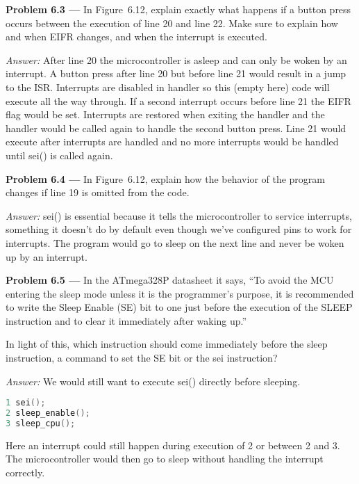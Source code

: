 \documentclass[11pt]{article}
\newcommand{\problem}[1]{\textbf{Problem #1 ---} }
\newcommand{\answer}{\textit{Answer: } }
\begin{document}
\problem{6.3} In Figure~6.12, explain exactly what happens if a button press occurs between the execution of line 20 and line 22.  Make sure to explain how and when \textsf{EIFR} changes, and when the interrupt is executed.

\answer After line 20 the microcontroller is asleep and can only be woken by an interrupt.
A button press after line 20 but before line 21 would result in a jump to the ISR. Interrupts are disabled in handler so this (empty here) code will execute all the way through.
If a second interrupt occurs before line 21 the EIFR flag would be set. Interrupts are restored when exiting the handler and the handler would be called again to handle the second button press.
Line 21 would execute after interrupts are handled and no more interrupts would be handled until \textsf{sei()} is called again.

\problem{6.4} In Figure~6.12, explain how the behavior of the program changes
if line 19 is omitted from the code.

\answer \textsf{sei()} is essential because it tells the microcontroller to service interrupts, something it doesn't do by default even though we've configured pins to work for interrupts. The program would go to sleep on the next line and never be woken up by an interrupt.

\problem{6.5} In the ATmega328P datasheet it says, ``To avoid the MCU entering
the sleep mode unless it is the programmer’s purpose, it is recommended to
write the Sleep Enable (\textsf{SE}) bit to one just before the execution of
the \textsf{SLEEP} instruction and to clear it immediately after waking up.''

In light of this, which instruction should come immediately before the sleep
instruction, a command to set the \textsf{SE} bit or the \textsf{sei}
instruction?

\answer We would still want to execute \textsf{sei()} directly before sleeping.

\begin{lstlisting}[language=C,columns=flexible,basicstyle=\ttfamily,commentstyle=\ttfamily]
1 sei();
2 sleep_enable();
3 sleep_cpu();
\end{lstlisting}

Here an interrupt could still happen during execution of 2 or between 2 and 3.
The microcontroller would then go to sleep without handling the interrupt correctly.
\end{document}
